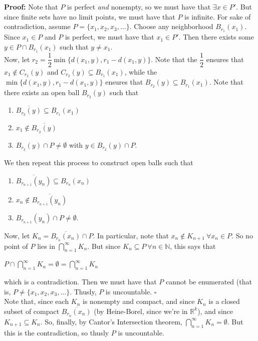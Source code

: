 \documentclass{article}
\begin{document}
\textbf{Proof:} Note that $P$ is perfect \textit{and} nonempty, so we must have that $\exists x \in P'$. But since finite sets have no limit points, we must have that $P$ is infinite. For sake of contradiction, assume $P = \{x_1, x_2, x_3, \dots \}$. Choose any neighborhood $B_{r_1}(x_1)$. Since $x_1 \in P$ and $P$ is perfect, we must have that $x_1 \in P'$. Then there exists some $y \in P \cap B_{r_1}(x_1)$ such that $y \neq x_1$.\\

Now, let $r_2 = \dfrac{1}{2} \min{\{d(x_1,y), r_1-d(x_1,y)\}}$. Note that the $\dfrac{1}{2}$ ensures that $x_1 \notin C_{r_2}(y)$ and $C_{r_2}(y) \subseteq B_{r_1}(x_1)$, while the $\min{\{d(x_1,y), r_1-d(x_1,y)\}}$ ensures that $B_{r_2}(y) \subseteq B_{r_1}(x_1)$. Note that there exists an open ball $B_{r_2}(y)$ such that 
\begin{enumerate}
    \item $\overline{B_{r_2}(y)} \subseteq B_{r_1}(x_1)$
    \item $x_1 \notin \overline{B_{r_2}(y)}$
    \item $B_{r_2}(y) \cap P \neq \emptyset$ with $y \in B_{r_2}(y) \cap P$.
\end{enumerate}

We then repeat this process to construct open balls such that 

\begin{enumerate}
    \item $\overline{B_{r_{n+1}}(y_n)} \subseteq B_{r_n}(x_n)$
    \item $x_n \notin \overline{B_{r_{n+1}}(y_n)}$
    \item $B_{r_{n+1}}(y_n) \cap P \neq \emptyset$.
\end{enumerate}

Now, let $K_n = \overline{B_{r_n}(x_n)} \cap P$. In particular, note that $x_n \notin K_{n+1} \ \forall x_n \in P$. So no point of $P$ lies in $\bigcap_{n = 1}^{\infty}K_n$. But since $K_n \subseteq P \ \forall n \in \mathbb{N}$, this says that 
\begin{center}
    $P \cap \bigcap_{n=1}^{\infty}K_n = \emptyset = \bigcap_{n=1}^{\infty}K_n$
\end{center}

which is a contradiction. Then we must have that $P$ cannot be enumerated (that is, $P \neq \{x_1, x_2, x_3, \dots\}$. Thusly, $P$ is uncountable. $\square$\\

Note that, since each $K_n$ is nonempty and compact, and since $K_n$ is a closed subset of compact $\overline{B_{r_n}(x_n)}$ (by Heine-Borel, since we're in $\mathbb{R}^k$), and since $K_{n+1} \subseteq K_n$. So, finally, by Cantor's Intersection theorem, $\bigcap_{n=1}^{\infty}K_n = \emptyset$. But this is the contradiction, so thusly $P$ is uncountable.\\
\end{document}
